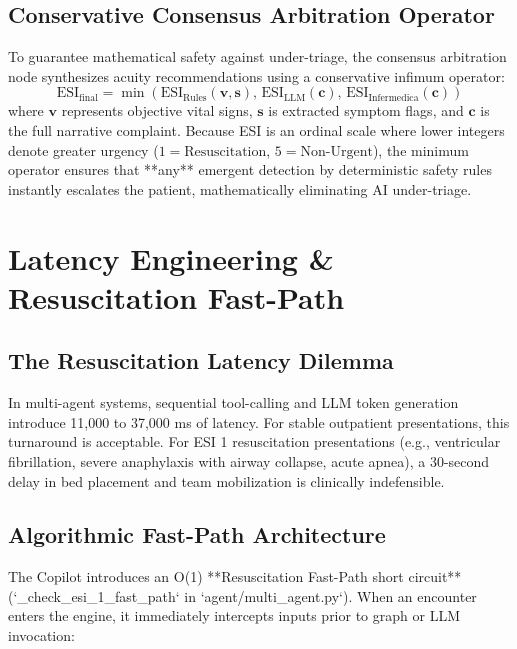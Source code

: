 \documentclass[11pt,a4paper]{article}
\begin{document}
\subsection{Conservative Consensus Arbitration Operator}
To guarantee mathematical safety against under-triage, the consensus arbitration node synthesizes acuity recommendations using a conservative infimum operator:
\begin{equation}
    \text{ESI}_{\text{final}} = \min \left( \text{ESI}_{\text{Rules}}(\mathbf{v}, \mathbf{s}), \, \text{ESI}_{\text{LLM}}(\mathbf{c}), \, \text{ESI}_{\text{Infermedica}}(\mathbf{c}) \right)
\end{equation}
where $\mathbf{v}$ represents objective vital signs, $\mathbf{s}$ is extracted symptom flags, and $\mathbf{c}$ is the full narrative complaint. Because ESI is an ordinal scale where lower integers denote greater urgency ($1 = \text{Resuscitation}$, $5 = \text{Non-Urgent}$), the minimum operator ensures that **any** emergent detection by deterministic safety rules instantly escalates the patient, mathematically eliminating AI under-triage.

\section{Latency Engineering \& Resuscitation Fast-Path}

\subsection{The Resuscitation Latency Dilemma}
In multi-agent systems, sequential tool-calling and LLM token generation introduce 11,000 to 37,000 ms of latency. For stable outpatient presentations, this turnaround is acceptable. For ESI 1 resuscitation presentations (e.g., ventricular fibrillation, severe anaphylaxis with airway collapse, acute apnea), a 30-second delay in bed placement and team mobilization is clinically indefensible.

\subsection{Algorithmic Fast-Path Architecture}
The Copilot introduces an O(1) **Resuscitation Fast-Path short circuit** (`_check_esi_1_fast_path` in `agent/multi_agent.py`). When an encounter enters the engine, it immediately intercepts inputs prior to graph or LLM invocation:
\end{document}
